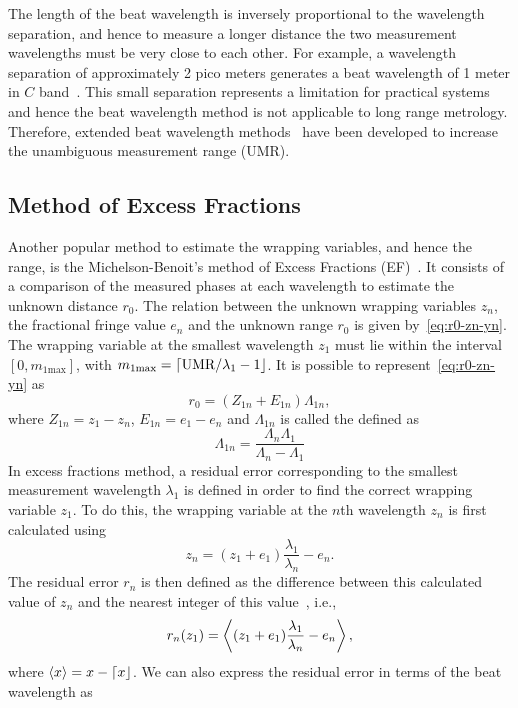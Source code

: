 The length of the beat wavelength is inversely proportional to the wavelength separation, and hence to measure a longer distance the two measurement wavelengths must be very close to each other. For example, a wavelength separation of approximately 2 pico meters generates a beat wavelength of 1 meter in $C$ band~\cite{Falaggis:09}. This small separation represents a limitation for practical systems and hence the beat wavelength method is not applicable to long range metrology. Therefore, extended beat wavelength methods~\cite{deGroot_94, Falaggis:09, Towers2011} have been developed to increase the unambiguous measurement range (UMR). 


\subsection{Method of Excess Fractions}
Another popular method to estimate the wrapping variables, and hence the range, is the Michelson-Benoit's method of Excess Fractions (EF)~\cite{Falaggis_excess_fractions_2011}. It consists of a comparison of the measured phases at each wavelength to estimate the unknown distance $r_0$. The relation between the unknown wrapping variables $z_n$, the fractional fringe value $e_n$ and the unknown range $r_0$ is given by~\ref{eq:r0-zn-yn}. The wrapping variable at the smallest wavelength $z_1$ must lie within the interval $[0, m_{1\text{max}}]$, with $m_{1\text{max}} = {\left\lceil \text{UMR}/\lambda_1 -1 \right\rfloor}$. It is possible to represent~\ref{eq:r0-zn-yn} as
\[
r_0 = (Z_{1n} + E_{1n})\Lambda_{1n},
\]
where $Z_{1n} = z_1 - z_n$, $E_{1n}=e_{1} -e_{n}$ and $\Lambda_{1n}$ is called the  defined as
\[
\Lambda_{1n} = \dfrac{\Lambda_n\Lambda_1}{\Lambda_n - \Lambda_1}
\]
In excess fractions method, a residual error corresponding to the smallest measurement wavelength $\lambda_1$ is defined in order to find the correct wrapping variable $z_1$. To do this, the wrapping variable at the $n$th wavelength $z_n$ is first calculated using~\cite{Falaggis_excess_fractions_2011}
\[
z_n = (z_1 + e_1)\dfrac{\lambda_1}{\lambda_n} - e_n.
\]
The residual error $r_n$ is then defined as the difference between this calculated value of $z_n$ and the nearest integer of this value~\cite{Falaggis_excess_fractions_2011}, i.e.,
\begin{equation}\label{eq:residual-error-1}
r_n(z_1) = \left\langle (z_1 + e_1)\dfrac{\lambda_1}{\lambda_n} - e_n \right\rangle,
\end{equation}
where $\left\langle x \right\rangle=x - {\left\lceil x \right\rfloor}$. We can also express the residual error in terms of the beat wavelength as 
